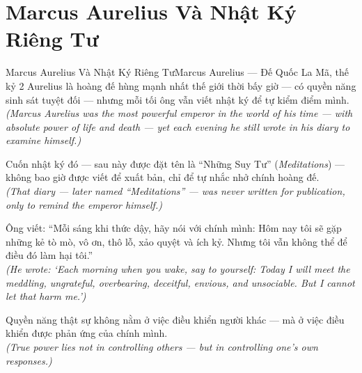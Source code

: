 \section{Marcus Aurelius Và Nhật Ký Riêng Tư}
\begin{truyen}{Marcus Aurelius Và Nhật Ký Riêng Tư}{Marcus Aurelius --- Đế Quốc La Mã, thế kỷ 2}
 Aurelius là hoàng đế hùng mạnh nhất thế giới thời bấy giờ --- có quyền năng sinh sát tuyệt đối --- nhưng mỗi tối ông vẫn viết nhật ký để tự kiểm điểm mình.\\[4pt]
\textit{(Marcus Aurelius was the most powerful emperor in the world of his time --- with absolute power of life and death --- yet each evening he still wrote in his diary to examine himself.)}

Cuốn nhật ký đó --- sau này được đặt tên là ``Những Suy Tư'' (\textit{Meditations}) --- không bao giờ được viết để xuất bản, chỉ để tự nhắc nhở chính hoàng đế.\\[4pt]
\textit{(That diary --- later named ``Meditations'' --- was never written for publication, only to remind the emperor himself.)}

Ông viết: ``Mỗi sáng khi thức dậy, hãy nói với chính mình: Hôm nay tôi sẽ gặp những kẻ tò mò, vô ơn, thô lỗ, xảo quyệt và ích kỷ. Nhưng tôi vẫn không thể để điều đó làm hại tôi.''\\[4pt]
\textit{(He wrote: `Each morning when you wake, say to yourself: Today I will meet the meddling, ungrateful, overbearing, deceitful, envious, and unsociable. But I cannot let that harm me.')}

\end{truyen}
\begin{baihoc}
  Quyền năng thật sự không nằm ở việc điều khiển người khác --- mà ở việc điều khiển được phản ứng của chính mình.\\[4pt]
  \textit{(True power lies not in controlling others --- but in controlling one's own responses.)}
\end{baihoc}

